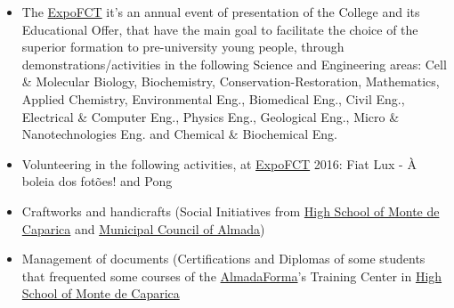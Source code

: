 \documentclass[10pt,a4paper,academicons]{altacv}
\begin{document}
\begin{itemize}
\item The \href{https://www.expo.fct.unl.pt/}{ExpoFCT} it's an annual event of presentation of the College and its Educational Offer, that have the main goal to facilitate the choice of the superior formation to pre-university young people, through demonstrations/activities in the following Science and Engineering areas: Cell \& Molecular Biology, Biochemistry, Conservation-Restoration, Mathematics, Applied Chemistry, Environmental Eng., Biomedical Eng., Civil Eng., Electrical \& Computer Eng., Physics Eng., Geological Eng., Micro \& Nanotechnologies Eng. and Chemical \& Biochemical Eng.
\item Volunteering in the following activities, at \href{https://www.expo.fct.unl.pt/}{ExpoFCT} 2016: Fiat Lux - À boleia dos fotões! and Pong
\end{itemize}

\divider

\begin{itemize}
\item Craftworks and handicrafts (Social Initiatives from \href{https://www.aecaparica.pt/escolas/escolas/escola-secundaria-do-monte-da-caparica/}{High School of Monte de Caparica} and \href{http://www.m-almada.pt/xportal/xmain?xpid=cmav2}{Municipal Council of Almada})
\item Management of documents (Certifications and Diplomas of some students that frequented some courses of the \href{https://www.almadaforma.net/}{AlmadaForma}'s Training Center in \href{https://www.aecaparica.pt/escolas/escolas/escola-secundaria-do-monte-da-caparica/}{High School of Monte de Caparica}
\end{itemize}
\end{document}
